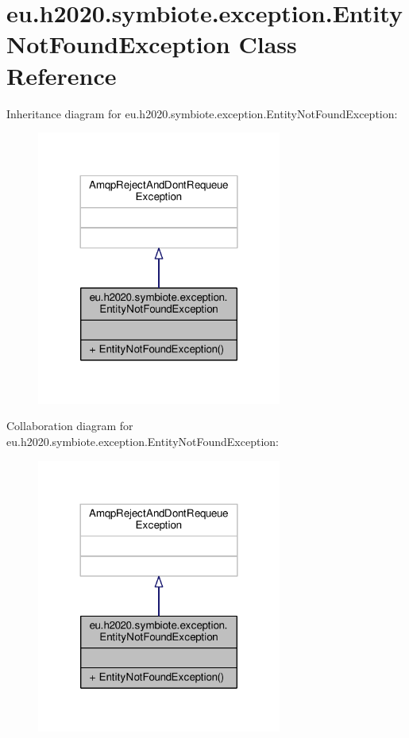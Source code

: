 \hypertarget{classeu_1_1h2020_1_1symbiote_1_1exception_1_1EntityNotFoundException}{}\section{eu.\+h2020.\+symbiote.\+exception.\+Entity\+Not\+Found\+Exception Class Reference}
\label{classeu_1_1h2020_1_1symbiote_1_1exception_1_1EntityNotFoundException}


Inheritance diagram for eu.\+h2020.\+symbiote.\+exception.\+Entity\+Not\+Found\+Exception\+:
\nopagebreak
\begin{figure}[H]
\begin{center}
\leavevmode
\includegraphics[width=228pt]{classeu_1_1h2020_1_1symbiote_1_1exception_1_1EntityNotFoundException__inherit__graph}
\end{center}
\end{figure}


Collaboration diagram for eu.\+h2020.\+symbiote.\+exception.\+Entity\+Not\+Found\+Exception\+:
\nopagebreak
\begin{figure}[H]
\begin{center}
\leavevmode
\includegraphics[width=228pt]{classeu_1_1h2020_1_1symbiote_1_1exception_1_1EntityNotFoundException__coll__graph}
\end{center}
\end{figure}
